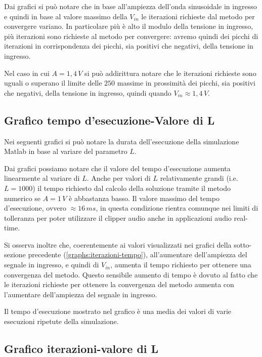 			\graficospace
			\graficospace
			\graficospace
			\graficospace
			
			Dai grafici si può notare che in base all'ampiezza dell'onda sinusoidale in ingresso e quindi in base al valore massimo della $V_{in}$ le iterazioni richieste dal metodo per convergere variano. In particolare più è alto il modulo della tensione in ingresso, più iterazioni sono richieste al metodo per convergere: avremo quindi dei picchi di iterazioni in corrispondenza dei picchi, sia positivi che negativi, della tensione in ingresso.
			
			Nel caso in cui $A = 1,4\,V$ si può addirittura notare che le iterazioni richieste sono uguali o superano il limite delle $250$ massime in prossimità dei picchi, sia positivi che negativi, della tensione in ingresso, quindi quando $V_{in} \approx 1,4\,V$.
			\pagebreak
		
		\subsection{Grafico tempo d'esecuzione-Valore di L}
			Nei seguenti grafici si può notare la durata dell'esecuzione della simulazione Matlab in base al variare del parametro $L$.
			\graficospace
			\graficospace
			
			Dai grafici possiamo notare che il valore del tempo d'esecuzione aumenta linearmente al variare di $L$. Anche per valori di $L$ relativamente grandi (i.e. $L = 1000$) il tempo richiesto dal calcolo della soluzione tramite il metodo numerico se $A = 1\,V$ è abbastanza basso. Il valore massimo del tempo d'esecuzione, ovvero $\approx 16\,ms$, in questa condizione rientra comunque nei limiti di tolleranza per poter utilizzare il clipper audio anche in applicazioni audio real-time.
			
			Si osserva inoltre che, coerentemente ai valori visualizzati nei grafici della sotto-sezione precedente (\ref{graphs:iterazioni-tempo}), all'aumentare dell'ampiezza del segnale in ingresso, e quindi di $V_{in}$, aumenta il tempo richiesto per ottenere una convergenza del metodo. Questo sensibile aumento di tempo è dovuto al fatto che le iterazioni richieste per ottenere la convergenza del metodo aumenta con l'aumentare dell'ampiezza del segnale in ingresso.
			
			Il tempo d'esecuzione mostrato nel grafico è una media dei valori di varie esecuzioni ripetute della simulazione.
			
		\subsection{Grafico iterazioni-valore di L}
